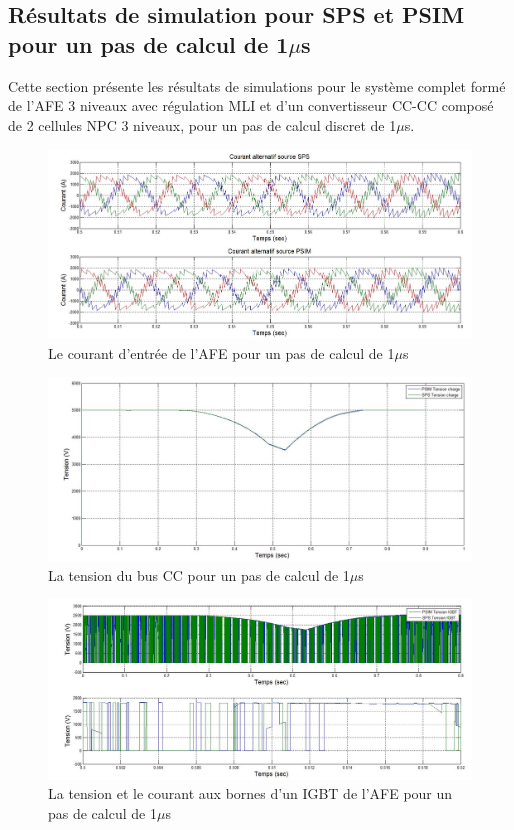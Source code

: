 \subsection{Résultats de simulation pour SPS et PSIM pour un pas de calcul de 1$\mu$s}
Cette section présente les résultats de simulations pour le système complet formé de l'AFE 3 niveaux avec régulation MLI et d'un convertisseur CC-CC composé de 2 cellules NPC 3 niveaux, pour un pas de calcul discret de 1$\mu$s. 

\begin{figure}[htb]
\centering
\includegraphics[scale=0.5]{fig/DCP_AFE/1u/cour_al.jpg}
\caption{Le courant d'entrée de l'AFE pour un pas de calcul de 1$\mu$s}
\label{AF_DC_cou1}
\end{figure}


\begin{figure}[htb]
\centering
\includegraphics[scale=0.5]{fig/DCP_AFE/1u/ten_bus.jpg}
\caption{La tension du bus CC pour un pas de calcul de 1$\mu$s}
\label{AF_DC_vch1}
\end{figure}



\begin{figure}[htb]
\centering
\includegraphics[scale=0.5]{fig/DCP_AFE/1u/IGBT_afe.jpg}
\caption{La tension et le courant aux bornes d'un IGBT de l'AFE pour un pas de calcul de 1$\mu$s}
\label{AF_DC_IGBT1}
\end{figure}


